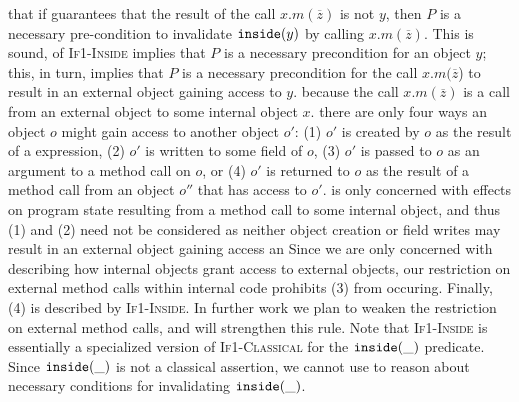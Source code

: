 
 that if   guarantees that the result of
the call $x.m(\overline{z})$  
 is not $y$, then $P$ is a necessary pre-condition to invalidate $\texttt{inside}( y )$ by calling
$x.m(\overline{z})$.
This is sound,  of \textsc{If1-Inside} implies that  $P$ is
a necessary precondition for  an object $y$; this, in turn,
implies that    $P$ is a necessary precondition for the call $x.m(\overline{z}$) to 
result in an external object gaining access to $y$.
 because
 
the call  $x.m(\overline{z})$ is a call from an external object to
some internal object $x$.  there are only four ways
an object $o$ might gain access to another object $o'$: 
(1) $o'$ is created by $o$ as the result of a  expression, 
(2) $o'$ is written to some field of $o$, 
(3) $o'$ is passed to $o$ as an argument to a method call on $o$,
or (4) $o'$ is returned to $o$ as the result of a method call from an object $o''$ that has access to $o'$.
 is only concerned with 
effects on program state resulting from a method call to some internal object, and thus (1) and (2) need not be considered as 
neither object creation or field writes may result in an external object gaining access   
an
Since we are only concerned with describing how internal objects grant access to external objects,
our restriction on external method calls within internal code prohibits (3) from occuring. Finally,
(4) is described by \textsc{If1-Inside}.
In further work we plan to weaken the restriction on external method calls, and will  
strengthen this rule.
Note that \textsc{If1-Inside}  is essentially  a specialized version of \textsc{If1-Classical}
for the $\texttt{inside}( \_ )$ predicate. Since $\texttt{inside}( \_ )$ is not a classical
assertion, we cannot use \funcSpecs to reason about necessary conditions
for invalidating $\texttt{inside}( \_ )$.
 
